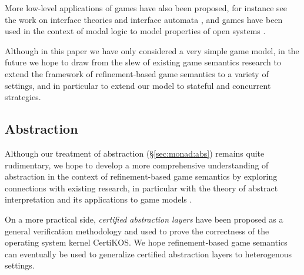 \documentclass[sigplan,10pt,review,anonymous]{acmart}
\begin{document}
More low-level applications of games have also been proposed,
for instance see the work on interface theories
and interface automata \cite{ia,gmos,itcd,gtf},
and games have been used in the context of modal logic
to model properties of open systems
\cite{atl,altref}.

Although in this paper we have only considered a very simple game model,
in the future we hope to draw from the slew of existing game semantics research
to extend the framework of refinement-based game semantics
to a variety of settings,
and in particular to extend our model
to stateful and concurrent strategies.


\subsection{Abstraction} %

Although our treatment of abstraction (\S\ref{sec:monad:abs})
remains quite rudimentary,
we hope to develop a more comprehensive understanding
of abstraction in the context of refinement-based game semantics
by exploring connections with existing research,
in particular with
the theory of abstract interpretation \cite{absint,aif}
and its applications to game models \cite{aigp}.

On a more practical side,
\emph{certified abstraction layers} \cite{popl15,osdi16,ccal}
have been proposed as a general verification methodology
and used to prove the correctness of the operating system kernel CertiKOS.
We hope refinement-based game semantics
can eventually be used to generalize
certified abstraction layers to heterogenous settings.


%
%
%
\end{document}
